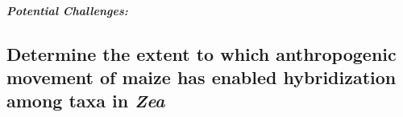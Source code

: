 \paragraph{\emph{Potential Challenges:}}


\subsection{Determine the extent to which anthropogenic movement of maize has enabled hybridization among taxa in \emph{Zea}} \label{ss:genuswide}



